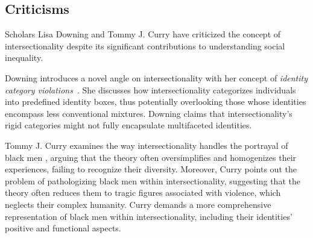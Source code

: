 \subsection{Criticisms}
\label{sec:int_criticisms}

Scholars Lisa Downing and Tommy J. Curry have criticized the concept of intersectionality despite its significant contributions to understanding social inequality.

Downing introduces a novel angle on intersectionality with her concept of \emph{identity category violations}~\cite{downing2018body}. She discusses how intersectionality categorizes individuals into predefined identity boxes, thus potentially overlooking those whose identities encompass less conventional mixtures. Downing claims that intersectionality's rigid categories might not fully encapsulate multifaceted identities.

Tommy J. Curry examines the way intersectionality handles the portrayal of black men \cite{curry2021decolonizing}, arguing that the theory often oversimplifies and homogenizes their experiences, failing to recognize their diversity. Moreover, Curry points out the problem of pathologizing black men within intersectionality, suggesting that the theory often reduces them to tragic figures associated with violence, which neglects their complex humanity. Curry demands a more comprehensive representation of black men within intersectionality, including their identities' positive and functional aspects.

